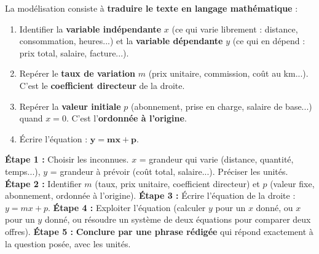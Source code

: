 \documentclass[11pt]{article}
\begin{document}
La modélisation consiste à \textbf{traduire le texte en langage mathématique} :
\begin{enumerate}
    \item Identifier la \textbf{variable indépendante} $x$ (ce qui varie librement : distance, consommation, heures...) et la \textbf{variable dépendante} $y$ (ce qui en dépend : prix total, salaire, facture...).
    \item Repérer le \textbf{taux de variation} $m$ (prix unitaire, commission, coût au km...). C'est le \textbf{coefficient directeur} de la droite.
    \item Repérer la \textbf{valeur initiale} $p$ (abonnement, prise en charge, salaire de base...) quand $x=0$. C'est l'\textbf{ordonnée à l'origine}.
    \item Écrire l'équation : $\mathbf{y = mx + p}$.
\end{enumerate}

\begin{methode}
\textbf{Étape 1 :} Choisir les inconnues. $x$ = grandeur qui varie (distance, quantité, temps...), $y$ = grandeur à prévoir (coût total, salaire...). Préciser les unités.
\textbf{Étape 2 :} Identifier $m$ (taux, prix unitaire, coefficient directeur) et $p$ (valeur fixe, abonnement, ordonnée à l'origine).
\textbf{Étape 3 :} Écrire l'équation de la droite : $y = mx + p$.
\textbf{Étape 4 :} Exploiter l'équation (calculer $y$ pour un $x$ donné, ou $x$ pour un $y$ donné, ou résoudre un système de deux équations pour comparer deux offres).
\textbf{Étape 5 :} \textbf{Conclure par une phrase rédigée} qui répond exactement à la question posée, avec les unités.
\end{methode}
\end{document}
